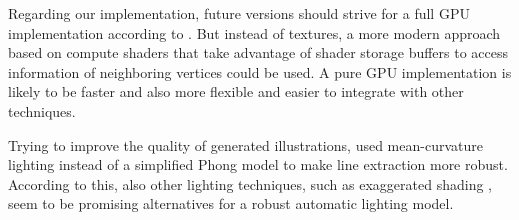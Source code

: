 \documentclass[9pt,fleqn,twoside,twocolumn]{stdglobal}
\begin{document}
  Regarding our implementation, future versions should strive for a full GPU implementation according to \textcite{zhang2010}.
  But instead of textures, a more modern approach based on compute shaders that take advantage of shader storage buffers to access information of neighboring vertices could be used.
  A pure GPU implementation is likely to be faster and also more flexible and easier to integrate with other techniques.

  Trying to improve the quality of generated illustrations, \citeauthor{zhang2010} used mean-curvature lighting \autocite{kindlmann2003,kolomenkin2008} instead of a simplified Phong model to make line extraction more robust.
  According to this, also other lighting techniques, such as exaggerated shading \autocite{rusinkiewicz2006}, seem to be promising alternatives for a robust automatic lighting model.

\nocite{*}
\AtNextBibliography{\footnotesize}
\printbibliography[heading=bibintoc]

\appendix
\end{document}
